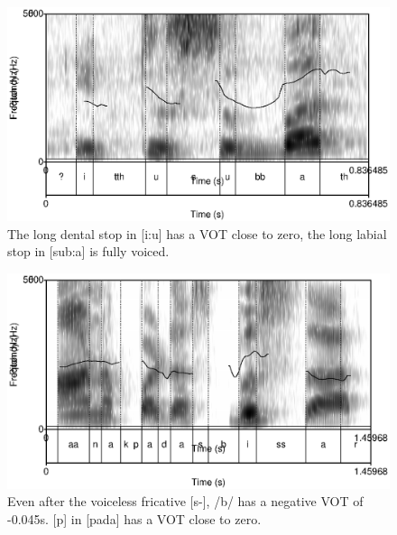 \begin{figure}
 \centering
 \includegraphics[height=0.3\textheight]{./pics/itthusubbath.eps}
%
 \caption{The  long dental stop in [i\dentt:u] has a VOT close to zero, the  long labial stop in [sub:a\dentt] is fully voiced.}
 \label{fig:phon:vot:itthusubbath}
\end{figure}




\begin{figure}
 \centering
 \includegraphics[height=0.3\textheight]{./pics/sbissar.eps}

 \caption{Even after the voiceless fricative [s-], /b/  has a negative VOT of -0.045s. [p] in [pada] has a VOT close to zero.}
 \label{fig:phon:vot:bissar}
\end{figure}


